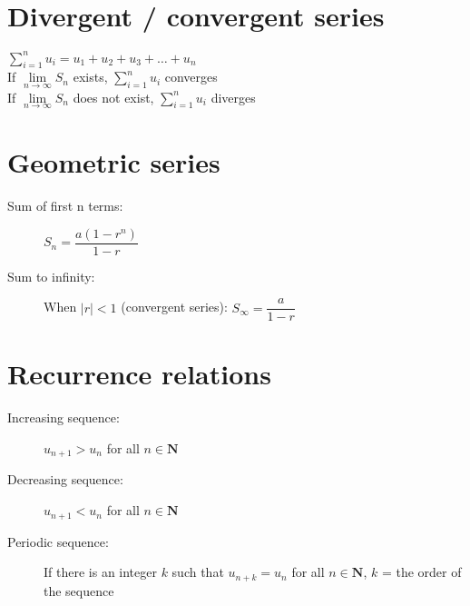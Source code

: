 \section{Divergent / convergent series}
$\sum\limits_{i=1}^{n} u_i = u_1+u_2+u_3+\dots+u_n$\\
If $\lim\limits_{n \to \infty}S_n$ exists, $\sum\limits_{i=1}^{n} u_i$ converges\\
If $\lim\limits_{n \to \infty}S_n$ does not exist, $\sum\limits_{i=1}^{n} u_i$ diverges
\section{Geometric series}
\begin{description}
    \item [Sum of first n terms:]$S_n = \dfrac{a(1-r^n)}{1-r}$
    \item [Sum to infinity:] When $|r|<1$ (convergent series): $S_\infty = \dfrac{a}{1-r}$
\end{description}

\section{Recurrence relations}
\begin{description}
    \item[Increasing sequence:] $u_{n+1}>u_n$ for all $n\in \mathbf{N}$
    \item[Decreasing sequence:] $u_{n+1}<u_n$ for all $n\in \mathbf{N}$
    \item[Periodic sequence:] If there is an integer $k$ such that $u_{n+k}=u_n$ for all $n\in \mathbf{N}$, $k$ = the order of the sequence
\end{description}
